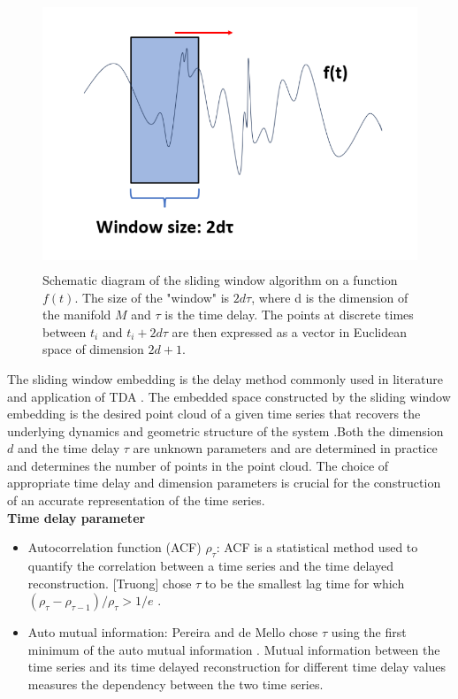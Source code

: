 \documentclass{article}
\begin{document}
\begin{figure}[h!]
    \centering
    \includegraphics[width = 12cm, height = 8cm]{Sliding_Window.png}
    \caption{Schematic diagram of the sliding window algorithm on a function $f(t)$. The size of the "window" is $2d\tau$, where d is the dimension of the manifold $M$ and $\tau$ is the time delay. The points at discrete times between $t_i$ and $t_{i} + 2d\tau$ are then expressed as a vector in Euclidean space of dimension $2d +1$.} 
    \label{Sliding Window}
\end{figure}
The sliding window embedding is the delay method commonly used in literature and application of TDA \cite{akingbade2023topological}\cite{CSurfaceDataChung}\cite{Umeda2019TopologicalDA}\cite{Gidea2017TopologicalDA}. The embedded space constructed by the sliding window embedding is the desired point cloud of a given time series that recovers the underlying dynamics and geometric structure of the system \cite{twistytakensPerea} \cite{dynamicalsystemsHiroki}.Both the dimension $d$ and the time delay $\tau$ are unknown parameters and are determined in practice \cite{ravishanker2019topological} and determines the number of points in the point cloud. The choice of appropriate time delay and dimension parameters is crucial for the construction of an accurate representation of the time series.\\
\textbf{Time delay parameter}
\begin{itemize}
    \item Autocorrelation function (ACF) $\rho_{\tau}$: ACF is a statistical method used to quantify the correlation between a time series and the time delayed reconstruction. [Truong] chose $\tau$ to be the smallest lag time for which $(\rho_{\tau} - \rho_{\tau -1})/\rho_{\tau} > 1/e$ \cite{ravishanker2019topological}. 
    \item Auto mutual information: Pereira and de Mello \cite{PEREIRA20156026} chose $\tau$ using the first minimum of the auto mutual information \cite{ravishanker2019topological}. Mutual information between the time series and its time delayed reconstruction for different time delay values measures the dependency between the two time series. 
\end{itemize}
\end{document}
